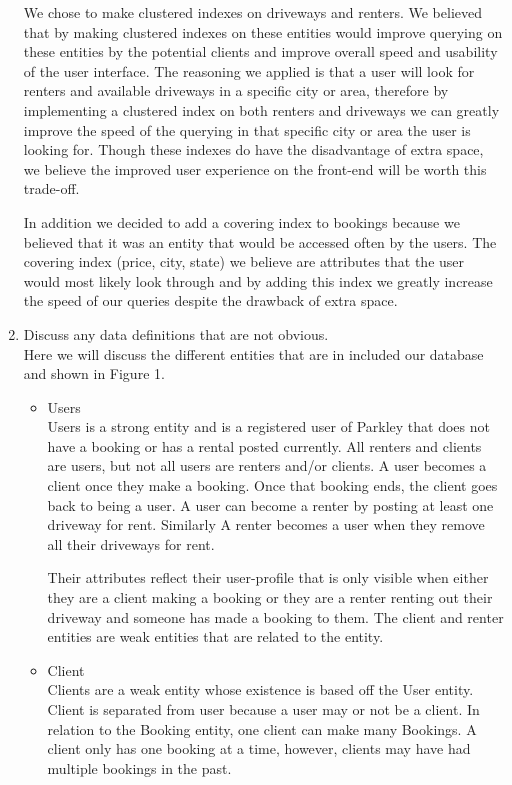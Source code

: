 \documentclass[a4paper]{article}
\begin{document}
\begin{enumerate}
We chose to make clustered indexes on driveways and renters. We believed that by making clustered indexes on these entities would improve querying on these entities by the potential clients and improve overall speed and usability of the user interface. The reasoning we applied is that a user will look for renters and available driveways in a specific city or area, therefore by implementing a clustered index on both renters and driveways we can greatly improve the speed of the querying in that specific city or area the user is looking for. Though these indexes do have the disadvantage of extra space, we believe the improved user experience on the front-end will be worth this trade-off. 

In addition we decided to add a covering index to bookings because we believed that it was an entity that would be accessed often by the users. The covering index (price, city, state) we believe are attributes that the user would most likely look through and by adding this index we greatly increase the speed of our queries despite the drawback of extra space.
\item Discuss any data definitions that are not obvious.
\\

Here we will discuss the different entities that are in included our database and shown in Figure 1. 
\begin{itemize}
\item Users
\\

Users is a strong entity and is a registered user of Parkley that does not have a booking or has a rental posted currently. All renters and clients are users, but not all users are renters and/or clients. A user becomes a client once they make a booking. Once that booking ends, the client goes back to being a user. A user can become a renter by posting at least one driveway for rent. Similarly A renter becomes a user when they remove all their driveways for rent.

Their attributes reflect their user-profile that is only visible when either they are a client making a booking or they are a renter renting out their driveway and someone has made a booking to them. The client and renter entities are weak entities that are related to the entity.

\item Client
\\

Clients are a weak entity whose existence is based off the User entity. Client is separated from user because a user may or not be a client. In relation to the Booking entity, one client can make many Bookings. A client only has one booking at a time, however, clients may have had multiple bookings in the past.



\end{itemize}
\end{enumerate}
\end{document}
